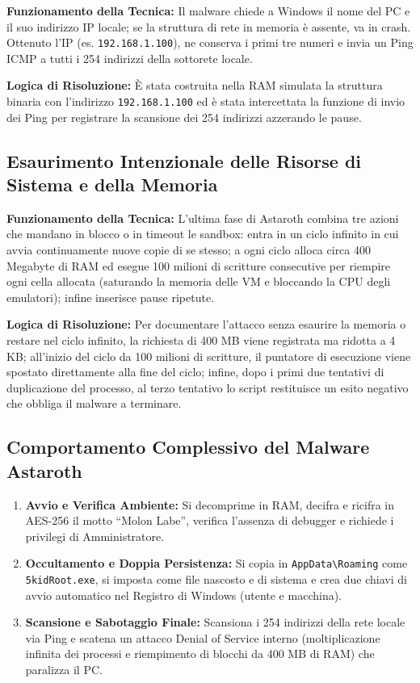 \documentclass[11pt, a4paper]{article}
\begin{document}
	\textbf{Funzionamento della Tecnica:} Il malware chiede a Windows il nome del PC e il suo indirizzo IP locale; se la struttura di rete in memoria è assente, va in crash. Ottenuto l'IP (es. \texttt{192.168.1.100}), ne conserva i primi tre numeri e invia un Ping ICMP a tutti i 254 indirizzi della sottorete locale.
	
	\textbf{Logica di Risoluzione:} È stata costruita nella RAM simulata la struttura binaria con l'indirizzo \texttt{192.168.1.100} ed è stata intercettata la funzione di invio dei Ping per registrare la scansione dei 254 indirizzi azzerando le pause.
	
	\subsection{Esaurimento Intenzionale delle Risorse di Sistema e della Memoria}
	
	\textbf{Funzionamento della Tecnica:} L'ultima fase di Astaroth combina tre azioni che mandano in blocco o in timeout le sandbox: entra in un ciclo infinito in cui avvia continuamente nuove copie di se stesso; a ogni ciclo alloca circa 400 Megabyte di RAM ed esegue 100 milioni di scritture consecutive per riempire ogni cella allocata (saturando la memoria delle VM e bloccando la CPU degli emulatori); infine inserisce pause ripetute.
	
	\textbf{Logica di Risoluzione:} Per documentare l'attacco senza esaurire la memoria o restare nel ciclo infinito, la richiesta di 400 MB viene registrata ma ridotta a 4 KB; all'inizio del ciclo da 100 milioni di scritture, il puntatore di esecuzione viene spostato direttamente alla fine del ciclo; infine, dopo i primi due tentativi di duplicazione del processo, al terzo tentativo lo script restituisce un esito negativo che obbliga il malware a terminare.
	
	\subsection{Comportamento Complessivo del Malware Astaroth}
	
	\begin{enumerate}
		\item \textbf{Avvio e Verifica Ambiente:} Si decomprime in RAM, decifra e ricifra in AES-256 il motto ``Molon Labe'', verifica l'assenza di debugger e richiede i privilegi di Amministratore.
		\item \textbf{Occultamento e Doppia Persistenza:} Si copia in \texttt{AppData\textbackslash Roaming} come \texttt{5kidRoot.exe}, si imposta come file nascosto e di sistema e crea due chiavi di avvio automatico nel Registro di Windows (utente e macchina).
		\item \textbf{Scansione e Sabotaggio Finale:} Scansiona i 254 indirizzi della rete locale via Ping e scatena un attacco Denial of Service interno (moltiplicazione infinita dei processi e riempimento di blocchi da 400 MB di RAM) che paralizza il PC.
	\end{enumerate}
	
\end{document}
